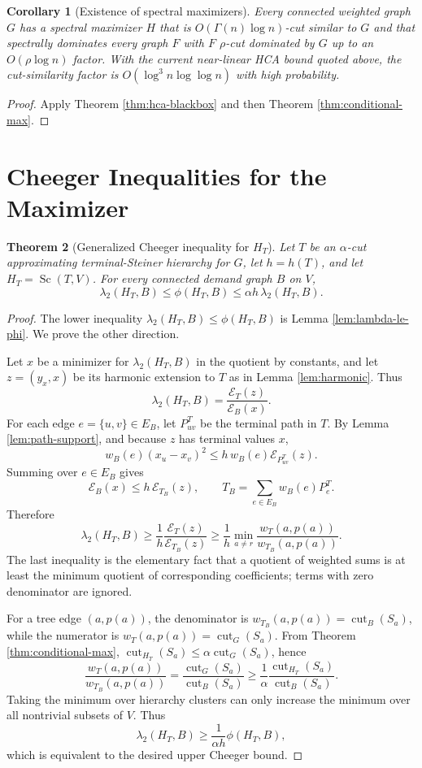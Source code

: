\documentclass[11pt]{article}
\newtheorem{theorem}{Theorem}[section]
\newtheorem{corollary}[theorem]{Corollary}
\newcommand{\cut}{\operatorname{cut}}
\newcommand{\Sc}{\operatorname{Sc}}
\newcommand{\E}{\mathcal{E}}
\begin{document}
\begin{corollary}[Existence of spectral maximizers]
\label{cor:existence}
Every connected weighted graph $G$ has a spectral maximizer $H$ that is
$O(\Gamma(n)\log n)$-cut similar to $G$ and that spectrally dominates every
graph $F$ with $F$ $\rho$-cut dominated by $G$ up to an
$O(\rho\log n)$ factor.  With the current near-linear HCA bound quoted above,
the cut-similarity factor is
$O(\log^3 n\log\log n)$ with high probability.
\end{corollary}

\begin{proof}
Apply Theorem \ref{thm:hca-blackbox} and then Theorem
\ref{thm:conditional-max}.
\end{proof}

\section{Cheeger Inequalities for the Maximizer}

\begin{theorem}[Generalized Cheeger inequality for $H_T$]
\label{thm:cheeger}
Let $T$ be an $\alpha$-cut approximating terminal-Steiner hierarchy for $G$,
let $h=h(T)$, and let $H_T=\Sc(T,V)$.  For every connected demand graph
$B$ on $V$,
\[
  \lambda_2(H_T,B)\le \phi(H_T,B)
  \le \alpha h\,\lambda_2(H_T,B).
\]
\end{theorem}

\begin{proof}
The lower inequality $\lambda_2(H_T,B)\le \phi(H_T,B)$ is Lemma
\ref{lem:lambda-le-phi}.  We prove the other direction.

Let $x$ be a minimizer for $\lambda_2(H_T,B)$ in the quotient by constants,
and let $z=(y_x,x)$ be its harmonic extension to $T$ as in Lemma
\ref{lem:harmonic}.  Thus
\[
  \lambda_2(H_T,B)=\frac{\E_T(z)}{\E_B(x)} .
\]
For each edge $e=\{u,v\}\in E_B$, let $P^T_{uv}$ be the terminal path in
$T$.  By Lemma \ref{lem:path-support}, and because $z$ has terminal values
$x$,
\[
  w_B(e)(x_u-x_v)^2
  \le h\, w_B(e)\E_{P^T_{uv}}(z).
\]
Summing over $e\in E_B$ gives
\[
  \E_B(x)\le h\,\E_{T_B}(z),
  \qquad
  T_B=\sum_{e\in E_B} w_B(e)P^T_e .
\]
Therefore
\[
  \lambda_2(H_T,B)
  \ge
  \frac{1}{h}\frac{\E_T(z)}{\E_{T_B}(z)}
  \ge
  \frac{1}{h}
  \min_{a\ne r}
  \frac{w_T(a,p(a))}{w_{T_B}(a,p(a))}.
\]
The last inequality is the elementary fact that a quotient of weighted sums
is at least the minimum quotient of corresponding coefficients; terms with
zero denominator are ignored.

For a tree edge $(a,p(a))$, the denominator is
$w_{T_B}(a,p(a))=\cut_B(S_a)$, while the numerator is
$w_T(a,p(a))=\cut_G(S_a)$.  From Theorem
\ref{thm:conditional-max}, $\cut_{H_T}(S_a)\le \alpha\cut_G(S_a)$, hence
\[
  \frac{w_T(a,p(a))}{w_{T_B}(a,p(a))}
  =
  \frac{\cut_G(S_a)}{\cut_B(S_a)}
  \ge
  \frac{1}{\alpha}
  \frac{\cut_{H_T}(S_a)}{\cut_B(S_a)} .
\]
Taking the minimum over hierarchy clusters can only increase the minimum over
all nontrivial subsets of $V$.  Thus
\[
  \lambda_2(H_T,B)
  \ge
  \frac{1}{\alpha h}\phi(H_T,B),
\]
which is equivalent to the desired upper Cheeger bound.
\end{proof}
\end{document}
